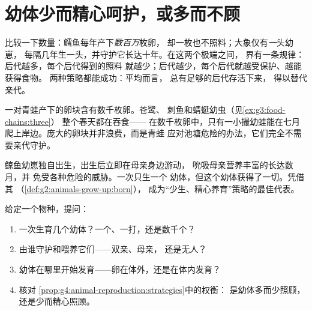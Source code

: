 \section{幼体少而精心呵护，或多而不顾}

\begin{proposition}[延续后代的两种策略]\label{prop:g4:animal-reproduction:strategies}
比较一下数量：鳕鱼每年产下\emph{数百万}枚卵，
却一枚也不照料；大象仅有\emph{一}头幼崽，
每隔几年生一头，并守护它长达十年。在这两个极端之间，
界有一条规律：后代越多，每个后代得到的照料
就越少；后代越少，每个后代就越受保护、越能获得食物。
两种策略都能成功：平均而言，
总有足够的后代存活下来，
得以替代亲代。
\end{proposition}
\admitted

\begin{example}[数一数池塘]\label{ex:g4:animal-reproduction:pondcount}
一对青蛙产下的卵块含有数千枚卵。苍鹭、
刺鱼和蜻蜓幼虫（见\cref{ex:g3:food-chains:three}）
整个春天都在吞食——
在数千枚卵中，只有一小撮幼蛙能在七月
爬上岸边。庞大的卵块并非浪费，而是青蛙
应对池塘危险的办法，它们完全不需要亲代守护。
\end{example}

\begin{example}[另一个极端]\label{ex:g4:animal-reproduction:whalecalf}
鲸鱼幼崽独自出生，出生后立即在母亲身边游动，
吮吸母亲营养丰富的长达数月，并
免受各种危险的威胁。一次只生一个
幼体，但这个幼体获得了一切。凭借其
（\cref{def:g2:animals-grow-up:born}），
成为“少生、精心养育”策略的最佳代表。
\end{example}

\begin{method}[阅读一个物种的策略]\label{met:g4:animal-reproduction:read}
给定一个物种，提问：
\begin{enumerate}
  \item 一次生育几个幼体？一个、一打，还是数千个？
  \item 由谁守护和喂养它们——双亲、母亲，
        还是无人？
  \item 幼体在哪里开始发育——卵在体外，还是在体内发育？
  \item 核对
        \cref{prop:g4:animal-reproduction:strategies}中的权衡：
        是幼体多而少照顾，还是少而精心照顾。
\end{enumerate}
\end{method}

